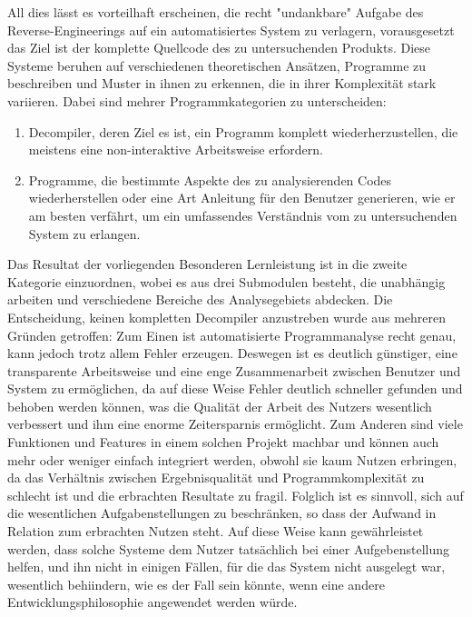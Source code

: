 \documentclass[11pt]{article} %
\begin{document}
All dies lässt es vorteilhaft erscheinen, die recht "undankbare" Aufgabe des Reverse-Engineerings auf ein
automatisiertes System zu verlagern, vorausgesetzt das Ziel ist der komplette Quellcode des zu
untersuchenden Produkts. Diese Systeme beruhen auf verschiedenen theoretischen Ansätzen,
Programme zu beschreiben und Muster in ihnen zu erkennen, die in ihrer Komplexität stark variieren.
Dabei sind mehrer Programmkategorien zu unterscheiden:
\begin{enumerate}
	\item{Decompiler, deren Ziel es ist, ein Programm
		komplett wiederherzustellen, die meistens eine non-interaktive Arbeitsweise erfordern.}
	\item{Programme, die bestimmte Aspekte des zu analysierenden Codes wiederherstellen oder eine Art
		Anleitung für den Benutzer generieren, wie er am besten verfährt, um ein umfassendes Verständnis
		vom zu untersuchenden System zu erlangen.}
\end{enumerate}
Das Resultat der vorliegenden Besonderen Lernleistung ist in
die zweite Kategorie einzuordnen, wobei es aus drei Submodulen besteht, die unabhängig arbeiten und
verschiedene Bereiche des Analysegebiets abdecken. Die Entscheidung, keinen kompletten Decompiler
anzustreben wurde aus mehreren Gründen getroffen: Zum Einen ist automatisierte Programmanalyse recht
genau, kann jedoch trotz allem Fehler erzeugen. Deswegen ist es deutlich günstiger, eine
transparente Arbeitsweise und eine enge Zusammenarbeit zwischen Benutzer und System zu ermöglichen,
da auf diese Weise Fehler deutlich schneller gefunden und behoben werden können, was die Qualität
der Arbeit des Nutzers wesentlich verbessert und ihm eine enorme Zeitersparnis ermöglicht. Zum Anderen sind
viele Funktionen und Features in einem solchen Projekt machbar und können auch mehr oder weniger
einfach integriert werden, obwohl sie kaum Nutzen erbringen, da das Verhältnis zwischen
Ergebnisqualität und Programmkomplexität zu schlecht ist und die erbrachten Resultate zu fragil.
Folglich ist es sinnvoll, sich auf die wesentlichen Aufgabenstellungen zu beschränken, so dass
der Aufwand in Relation zum erbrachten Nutzen steht. Auf diese Weise kann gewährleistet werden, dass
solche Systeme dem Nutzer tatsächlich bei einer Aufgebenstellung helfen, und ihn nicht in einigen Fällen,
für die das System nicht ausgelegt war, wesentlich behiindern, wie es der Fall sein könnte, wenn eine
andere Entwicklungsphilosophie angewendet werden würde.
\end{document}

